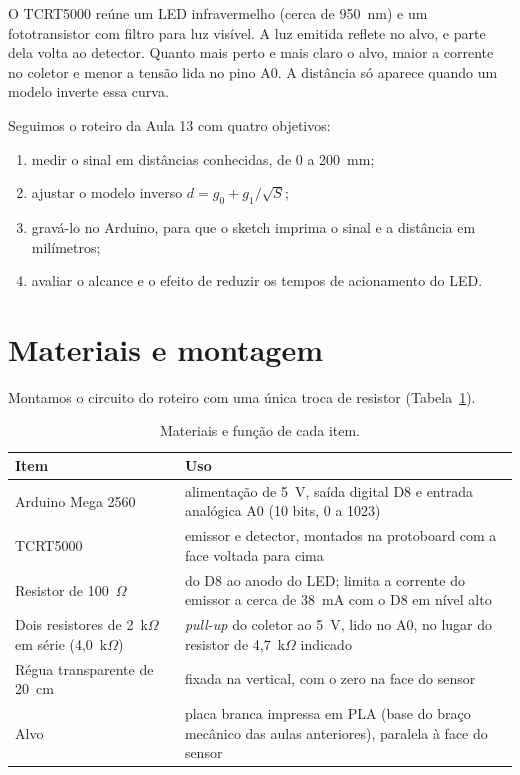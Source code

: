 \documentclass[11pt,a4paper]{article}
\begin{document}
O TCRT5000 reúne um LED infravermelho (cerca de 950~nm) e um fototransistor com filtro para luz visível. A luz emitida reflete no alvo, e parte dela volta ao detector. Quanto mais perto e mais claro o alvo, maior a corrente no coletor e menor a tensão lida no pino A0. A distância só aparece quando um modelo inverte essa curva.

Seguimos o roteiro da Aula 13 com quatro objetivos:
\begin{enumerate}
  \item medir o sinal em distâncias conhecidas, de 0 a 200~mm;
  \item ajustar o modelo inverso $d = g_0 + g_1/\sqrt{S}$;
  \item gravá-lo no Arduino, para que o sketch imprima o sinal e a distância em milímetros;
  \item avaliar o alcance e o efeito de reduzir os tempos de acionamento do LED.
\end{enumerate}

\section{Materiais e montagem}

Montamos o circuito do roteiro com uma única troca de resistor (Tabela~\ref{tab:materiais}).

\begin{table}[!htb]
\centering
\caption{Materiais e função de cada item.}
\label{tab:materiais}
\begin{tabularx}{\textwidth}{>{\raggedright\arraybackslash}p{4.6cm}X}
\toprule
Item & Uso \\
\midrule
Arduino Mega 2560 & alimentação de 5~V, saída digital D8 e entrada analógica A0 (10 bits, 0 a 1023) \\
TCRT5000 & emissor e detector, montados na protoboard com a face voltada para cima \\
Resistor de 100~$\Omega$ & do D8 ao anodo do LED; limita a corrente do emissor a cerca de 38~mA com o D8 em nível alto \\
Dois resistores de 2~k$\Omega$ em série (4,0~k$\Omega$) & \emph{pull-up} do coletor ao 5~V, lido no A0, no lugar do resistor de 4,7~k$\Omega$ indicado \\
Régua transparente de 20~cm & fixada na vertical, com o zero na face do sensor \\
Alvo & placa branca impressa em PLA (base do braço mecânico das aulas anteriores), paralela à face do sensor \\
\bottomrule
\end{tabularx}
\end{table}
\end{document}
